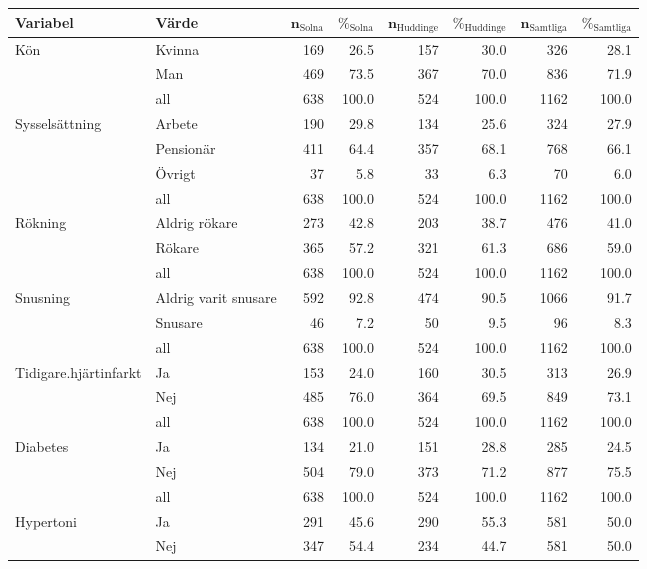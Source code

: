 \begin{table}[ht]
\centering
{\footnotesize
\begin{tabular}{ll|rr|rr|rr}
 \textbf{Variabel} & \textbf{Värde} & $\mathbf{n_{\mathrm{Solna}}}$ & $\mathbf{\%_{\mathrm{Solna}}}$ & $\mathbf{n_{\mathrm{Huddinge}}}$ & $\mathbf{\%_{\mathrm{Huddinge}}}$ & $\mathbf{n_{\mathrm{Samtliga}}}$ & $\mathbf{\%_{\mathrm{Samtliga}}}$ \\ 
  \hline
Kön & Kvinna & 169 & 26.5 & 157 & 30.0 & 326 & 28.1 \\ 
   & Man & 469 & 73.5 & 367 & 70.0 & 836 & 71.9 \\ 
   \hline
 & all & 638 & 100.0 & 524 & 100.0 & 1162 & 100.0 \\ 
   \hline
\hline
Sysselsättning & Arbete & 190 & 29.8 & 134 & 25.6 & 324 & 27.9 \\ 
   & Pensionär & 411 & 64.4 & 357 & 68.1 & 768 & 66.1 \\ 
   & Övrigt & 37 & 5.8 & 33 & 6.3 & 70 & 6.0 \\ 
   \hline
 & all & 638 & 100.0 & 524 & 100.0 & 1162 & 100.0 \\ 
   \hline
\hline
Rökning & Aldrig rökare & 273 & 42.8 & 203 & 38.7 & 476 & 41.0 \\ 
   & Rökare & 365 & 57.2 & 321 & 61.3 & 686 & 59.0 \\ 
   \hline
 & all & 638 & 100.0 & 524 & 100.0 & 1162 & 100.0 \\ 
   \hline
\hline
Snusning & Aldrig varit snusare & 592 & 92.8 & 474 & 90.5 & 1066 & 91.7 \\ 
   & Snusare & 46 & 7.2 & 50 & 9.5 & 96 & 8.3 \\ 
   \hline
 & all & 638 & 100.0 & 524 & 100.0 & 1162 & 100.0 \\ 
   \hline
\hline
Tidigare.hjärtinfarkt & Ja & 153 & 24.0 & 160 & 30.5 & 313 & 26.9 \\ 
   & Nej & 485 & 76.0 & 364 & 69.5 & 849 & 73.1 \\ 
   \hline
 & all & 638 & 100.0 & 524 & 100.0 & 1162 & 100.0 \\ 
   \hline
\hline
Diabetes & Ja & 134 & 21.0 & 151 & 28.8 & 285 & 24.5 \\ 
   & Nej & 504 & 79.0 & 373 & 71.2 & 877 & 75.5 \\ 
   \hline
 & all & 638 & 100.0 & 524 & 100.0 & 1162 & 100.0 \\ 
   \hline
\hline
Hypertoni & Ja & 291 & 45.6 & 290 & 55.3 & 581 & 50.0 \\ 
   & Nej & 347 & 54.4 & 234 & 44.7 & 581 & 50.0 \\ 

\end{tabular}}
\end{table}
